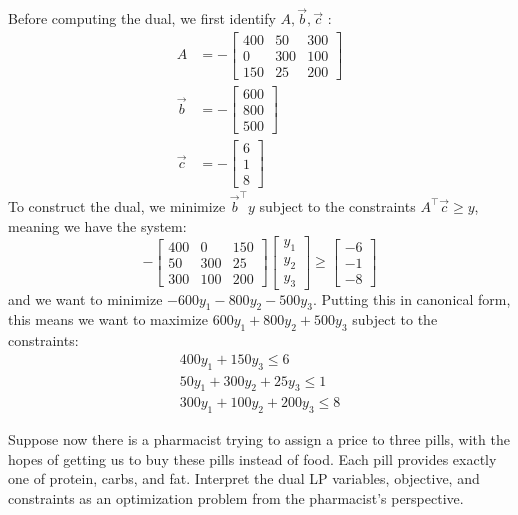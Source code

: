 \documentclass[11pt]{article}
\begin{document}
\begin{subparts}
\begin{solution}
	Before computing the dual, we first identify \(A, \vec b, \vec c\) :
	\begin{align*}
		A &= -\begin{bmatrix} 400 & 50 & 300\\ 0 & 300 & 100\\150 & 25 & 200\end{bmatrix} \\
		\vec b &= -\begin{bmatrix} 600\\800\\500 \end{bmatrix} \\
		\vec c &= -\begin{bmatrix} 6 \\ 1\\ 8 \end{bmatrix} 
	\end{align*}
	To construct the dual, we minimize \(\vec b^\top y\) subject to the constraints \(A^\top \vec c \ge y\), 
	meaning we have the system:
	\[
		-\begin{bmatrix} 400 & 0 & 150\\50 & 300 & 25\\300 & 100 &200 \end{bmatrix}
		\begin{bmatrix} y_1 \\ y_2 \\ y_3 \end{bmatrix}	\ge  \begin{bmatrix} -6 \\ -1 \\ -8 \end{bmatrix} 
	\] 
	and we want to minimize \(-600y_1 - 800y_2 - 500y_3\). Putting this in canonical form, this means 
	we want to maximize \(600y_1 + 800y_2 + 500y_3\) subject to the constraints:
	\begin{align*}
		400y_1 + 150y_3 \le  6\\
		50 y_1 + 300y_2 + 25y_3 \le 1\\
		300y_1 + 100y_2 + 200y_3 \le  8
	\end{align*}
\end{solution}
\subpart Suppose now there is a pharmacist trying to assign a price to three pills, with the hopes of getting us to buy these pills instead of food. Each pill provides exactly one of protein, carbs, and fat. 
Interpret the dual LP variables, objective, and constraints as an optimization problem from the pharmacist's perspective.


\end{subparts}
\end{document}
